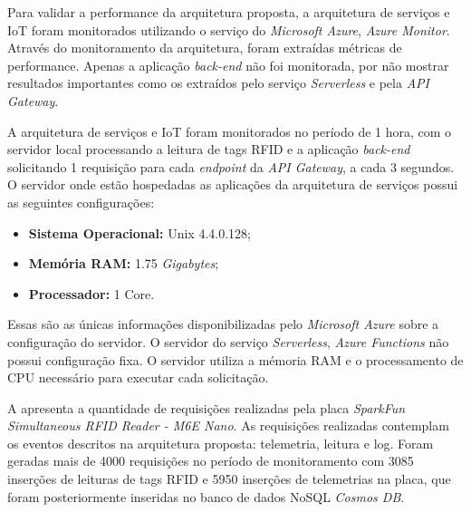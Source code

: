 
\newpage

Para validar a performance da arquitetura proposta, a arquitetura de serviços e \acrshort{IoT} foram monitorados utilizando o serviço do \textit{Microsoft Azure}, \textit{Azure Monitor}. Através do monitoramento da arquitetura, foram extraídas métricas de performance. Apenas a aplicação \textit{back-end} não foi monitorada, por não mostrar resultados importantes como os extraídos pelo serviço \textit{Serverless} e pela \textit{API Gateway}.

A arquitetura de serviços e \acrshort{IoT} foram monitorados no período de 1 hora, com o servidor local processando a leitura de tags \acrshort{RFID} e a aplicação \textit{back-end} solicitando 1 requisição para cada \textit{endpoint} da \textit{API Gateway}, a cada 3 segundos. O servidor onde estão hospedadas as aplicações da arquitetura de serviços possui as seguintes configurações:

\begin{itemize}
    \item \textbf{Sistema Operacional:} Unix 4.4.0.128;
    \item \textbf{Memória RAM:} 1.75 \textit{Gigabytes};
    \item \textbf{Processador:} 1 Core.
\end{itemize}

Essas são as únicas informações disponibilizadas pelo \textit{Microsoft Azure} sobre a configuração do servidor. O servidor do serviço \textit{Serverless}, \textit{Azure Functions} não possui configuração fixa. O servidor utiliza a mémoria RAM e o processamento de CPU necessário para executar cada solicitação.

A  apresenta a quantidade de requisições realizadas pela placa \textit{SparkFun Simultaneous RFID Reader - M6E Nano}. As requisições realizadas contemplam os eventos descritos na arquitetura proposta: telemetria, leitura e log. Foram geradas mais de 4000 requisições no período de monitoramento com 3085 inserções de leituras de tags \acrshort{RFID} e 5950 inserções de telemetrias na placa, que foram posteriormente inseridas no banco de dados \acrshort{NoSQL} \textit{Cosmos DB}.


